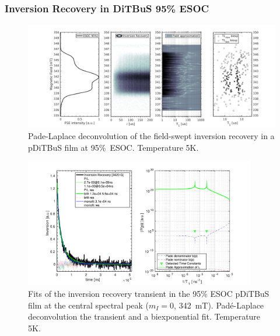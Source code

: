 \newpage
\subsubsection{Inversion Recovery in DiTBuS 95\% ESOC}
\begin{figure}[h]
\center
	\includegraphics[width=1\textwidth]{./pulse/figures/Figure_S16.pdf}
	\caption{Pade-Laplace deconvolution of the field-swept inversion recovery in a pDiTBuS film at 95\%~ESOC. Temperature 5K.}
	\label{fig:Figure_S16}
\end{figure}

\begin{figure}[ht!]
\center
	\includegraphics[width=0.9\textwidth]{./pulse/figures/Figure_S17.pdf}
	\caption{Fits of the inversion recovery transient in the 95\% ESOC pDiTBuS film at the central spectral peak ($m_I=0$, 342~mT). Pad{\'e}-Laplace deconvolution the transient and a biexponential fit. Temperature 5K.}
	\label{fig:Figure_S17}
\end{figure}


\newpage
